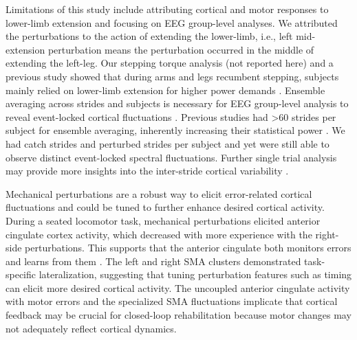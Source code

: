 \documentclass[../thesis_seyed.tex]{subfiles}
\begin{document}
Limitations of this study include attributing cortical and motor responses to lower-limb extension and {focusing on EEG group-level analyses}. We attributed the perturbations to the action of extending the lower-limb, i.e., left mid-extension perturbation means the perturbation occurred in the middle of extending the left-leg. Our stepping torque analysis (not reported here) and a previous study showed that during arms and legs recumbent stepping, subjects mainly relied on lower-limb extension for higher power demands \cite{Skinner2014-cl}. {Ensemble averaging across strides and subjects is necessary for EEG group-level analysis to reveal event-locked cortical fluctuations} \cite{Makeig1993-jx,Pfurtscheller1999-oi}. {Previous studies had >60 strides per subject for ensemble averaging, inherently increasing their statistical power} \cite{Peterson2018-ht,Wagner2016-nx}. {We had  catch strides and  perturbed strides per subject and yet were still able to observe distinct event-locked spectral fluctuations. Further single trial analysis may provide more insights into the inter-stride cortical variability} \cite{Wagner2019-at,Mierau2015-fd}.

Mechanical perturbations are a robust way to elicit error-related cortical fluctuations and could be tuned to further enhance desired cortical activity. During a seated locomotor task, mechanical perturbations elicited anterior cingulate cortex activity, which decreased with more experience with the right-side perturbations. This supports that the anterior cingulate both monitors errors and learns from them \cite{Holroyd2002-fl}. The left and right SMA clusters demonstrated task-specific lateralization, suggesting that tuning perturbation features such as timing can elicit more desired cortical activity. The uncoupled anterior cingulate activity with motor errors and the specialized SMA fluctuations implicate that cortical feedback may be crucial for closed-loop rehabilitation because motor changes may not adequately reflect cortical dynamics.




\end{document}
